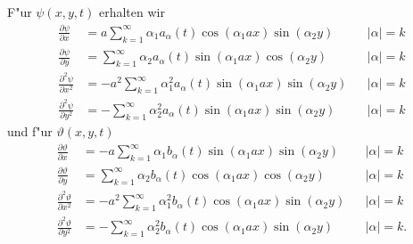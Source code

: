F"ur $\psi(x,y,t)$ erhalten wir
\begin{align*}
\frac{\partial\psi}{\partial x}
&=
a
\sum_{k = 1}^{\infty}
\alpha_1
a_{\alpha}(t)
\cos(\alpha_1 ax) \sin(\alpha_2 y)
&&|\alpha| = k
\\
\frac{\partial\psi}{\partial y}
&=
\sum_{k = 1}^{\infty}
\alpha_2
a_{\alpha}(t)
\sin(\alpha_1 ax) \cos(\alpha_2 y)
&&|\alpha| = k
\\
\frac{\partial^2\psi}{\partial x^2}
&=
-
a^2
\sum_{k = 1}^{\infty}
\alpha_1^2
a_{\alpha}(t)
\sin(\alpha_1 ax) \sin(\alpha_2 y)
&&|\alpha| = k
\\
\frac{\partial^2\psi}{\partial y^2}
&=
-
\sum_{k = 1}^{\infty}
\alpha_2^2
a_{\alpha}(t)
\sin(\alpha_1 ax) \sin(\alpha_2 y)
&&|\alpha| = k
\end{align*}
und f"ur $\vartheta(x,y,t)$
\begin{align*}
\frac{\partial\vartheta}{\partial x}
&=
-
a
\sum_{k = 1}^{\infty}
\alpha_1
b_{\alpha}(t)
\sin(\alpha_1 ax) \sin(\alpha_2 y)
&&|\alpha| = k
\\
\frac{\partial\vartheta}{\partial y}
&=
\sum_{k = 1}^{\infty}
\alpha_2
b_{\alpha}(t)
\cos(\alpha_1 ax) \cos(\alpha_2 y)
&&|\alpha| = k
\\
\frac{\partial^2\vartheta}{\partial x^2}
&=
-
a^2
\sum_{k = 1}^{\infty}
\alpha_1^2
b_{\alpha}(t)
\cos(\alpha_1 ax) \sin(\alpha_2 y)
&&|\alpha| = k
\\
\frac{\partial^2\vartheta}{\partial y^2}
&=
-
\sum_{k = 1}^{\infty}
\alpha_2^2
b_{\alpha}(t)
\cos(\alpha_1 ax) \sin(\alpha_2 y)
&&|\alpha| = k.
\end{align*}

